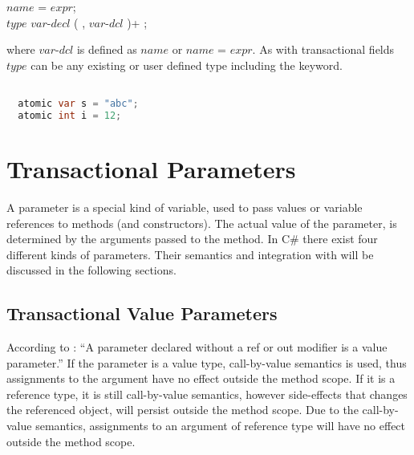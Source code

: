   $name$ = $expr$;\\
 $type$ $var$-$decl$ ( , $var$-$dcl$ )+ ; 

where $var$-$dcl$ is defined as $name$ or $name$ = $expr$. As with transactional fields $type$ can be any existing or user defined type including the  keyword.
\begin{lstlisting}[label=lst:local_variable,
  caption={Local Transactional Variable},
  language=Java,  
  showspaces=false,
  showtabs=false,
  breaklines=true,
  showstringspaces=false,
  breakatwhitespace=true,
  commentstyle=\color{greencomments},
  keywordstyle=\color{bluekeywords},
  stringstyle=\color{redstrings},
  morekeywords={atomic, retry, orElse, var, get, set}]  % Start your code-block

  atomic var s = "abc";
  atomic int i = 12;  
\end{lstlisting}

\section{Transactional Parameters}\label{sec:parameter_design}
A parameter is a special kind of variable, used to pass values or variable references to methods (and constructors). The actual value of the parameter, is determined by the arguments passed to the method\cite[p. 16]{csharp2013specificaiton}\cite[p. 14]{sestoft2011c}. In C\# there exist four different kinds of parameters. Their semantics and integration with \stmnamesp will be discussed in the following sections.


\subsection{Transactional Value Parameters}
According to \cite[p. 97]{csharp2013specificaiton}: ``A parameter declared without a ref or out modifier is a value parameter.'' If the parameter is a value type, call-by-value semantics is used, thus assignments to the argument have no effect outside the method scope. If it is a reference type, it is still call-by-value semantics, however side-effects that changes the referenced object, will persist outside the method scope. Due to the call-by-value semantics, assignments to an argument of reference type will have no effect outside the method scope\cite[p. 76]{sestoft2011c}.

